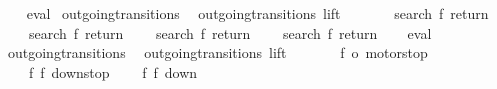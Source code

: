 \begin{isabellebody}
{\isacharbar}{\isacharbraceright}{\isachardoublequoteclose}\isanewline
%
\isadelimproof
\ \ %
\endisadelimproof
%
\isatagproof
{}\isamarkupfalse%
\ eval%
\endisatagproof
{\isafoldproof}%
%
\isadelimproof
\isanewline
%
\endisadelimproof
\isanewline
{}\isamarkupfalse%
\ outgoing{\isacharunderscore}transitions{\isacharunderscore}{}{\isacharcolon}\isanewline
\ \ {\isachardoublequoteopen}outgoing{\isacharunderscore}transitions\ lift\ {}\ {\isacharequal}\ {\isacharbraceleft}{\isacharbar}\isanewline
\ \ \ \ {\isacharparenleft}{\isacharparenleft}search{\isacharcomma}\ f{}{\isacharparenright}{\isacharcomma}\ return{}{\isacharparenright}{\isacharcomma}\isanewline
\ \ \ \ {\isacharparenleft}{\isacharparenleft}search{\isacharcomma}\ f{}{\isacharparenright}{\isacharcomma}\ return{}{\isacharparenright}{\isacharcomma}\isanewline
\ \ \ \ {\isacharparenleft}{\isacharparenleft}search{\isacharcomma}\ f{}{\isacharparenright}{\isacharcomma}\ return{}{\isacharparenright}{\isacharcomma}\isanewline
\ \ \ \ {\isacharparenleft}{\isacharparenleft}search{\isacharcomma}\ f{}{\isacharparenright}{\isacharcomma}\ return{}{\isacharparenright}\isanewline
{\isacharbar}{\isacharbraceright}{\isachardoublequoteclose}\isanewline
%
\isadelimproof
\ \ %
\endisadelimproof
%
\isatagproof
{}\isamarkupfalse%
\ eval%
\endisatagproof
{\isafoldproof}%
%
\isadelimproof
\isanewline
%
\endisadelimproof
\isanewline
{}\isamarkupfalse%
\ outgoing{\isacharunderscore}transitions{\isacharunderscore}{}{\isacharcolon}\isanewline
\ \ {\isachardoublequoteopen}outgoing{\isacharunderscore}transitions\ lift\ {}\ {\isacharequal}\ {\isacharbraceleft}{\isacharbar}\isanewline
\ \ \ \ {\isacharparenleft}{\isacharparenleft}f{}{\isacharcomma}\ o{}{\isacharparenright}{\isacharcomma}\ motorstop{}{\isacharparenright}{\isacharcomma}\isanewline
\ \ \ \ {\isacharparenleft}{\isacharparenleft}f{}{\isacharcomma}\ f{}{\isacharparenright}{\isacharcomma}\ down{}{}stop{\isacharparenright}{\isacharcomma}\isanewline
\ \ \ \ {\isacharparenleft}{\isacharparenleft}f{}{\isacharcomma}\ f{}{\isacharparenright}{\isacharcomma}\ down{}{}{\isacharparenright}\isanewline
{\isacharbar}{\isacharbraceright}{\isachardoublequoteclose}\isanewline
%
\isadelimproof
\ \ %
\endisadelimproof
%
\isatagproof
{}\isamarkupfalse%

\end{isabellebody}
